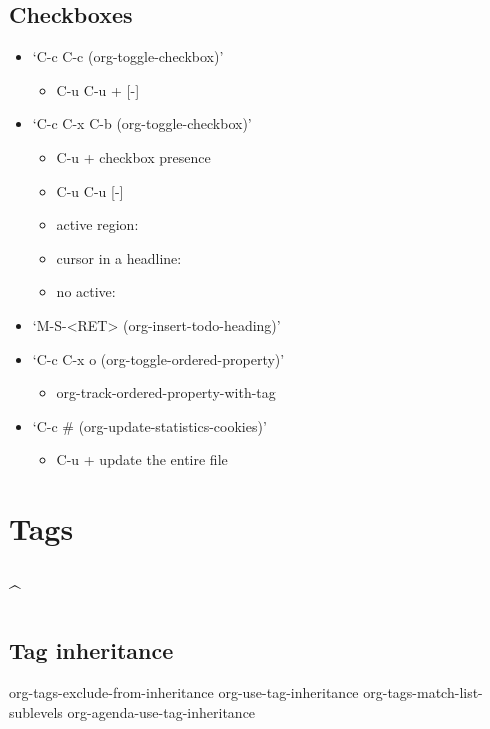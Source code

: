 \documentclass[11pt]{article}
\begin{document}
\subsection{Checkboxes}
\label{sec:orgb574004}
\begin{itemize}
\item ‘C-c C-c     (org-toggle-checkbox)’
\begin{itemize}
\item C-u C-u +  [-]
\end{itemize}
\item ‘C-c C-x C-b     (org-toggle-checkbox)’
\begin{itemize}
\item C-u +  checkbox presence
\item C-u C-u  [-]
\item active region:
\item cursor in a headline:
\item no active:
\end{itemize}
\item ‘M-S-<RET>     (org-insert-todo-heading)’
\item ‘C-c C-x o     (org-toggle-ordered-property)’
\begin{itemize}
\item org-track-ordered-property-with-tag
\end{itemize}
\item ‘C-c \#     (org-update-statistics-cookies)’
\begin{itemize}
\item C-u +  update the entire file
\end{itemize}
\end{itemize}
\section{Tags}
\label{sec:orgd83fbbe}
\subsection{\^{}}
\label{sec:org883b147}
\subsection{Tag inheritance}
\label{sec:org61b8022}
org-tags-exclude-from-inheritance
org-use-tag-inheritance
org-tags-match-list-sublevels
org-agenda-use-tag-inheritance
\end{document}
